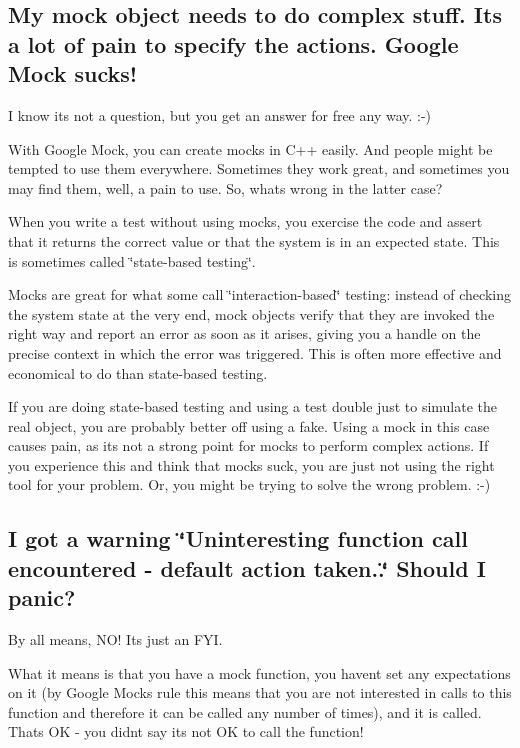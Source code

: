 \subsection*{My mock object needs to do complex stuff. It\textquotesingle{}s a lot of pain to specify the actions. Google Mock sucks!}

I know it\textquotesingle{}s not a question, but you get an answer for free any way. \+:-\/)

With Google Mock, you can create mocks in C++ easily. And people might be tempted to use them everywhere. Sometimes they work great, and sometimes you may find them, well, a pain to use. So, what\textquotesingle{}s wrong in the latter case?

When you write a test without using mocks, you exercise the code and assert that it returns the correct value or that the system is in an expected state. This is sometimes called \char`\"{}state-\/based testing\char`\"{}.

Mocks are great for what some call \char`\"{}interaction-\/based\char`\"{} testing\+: instead of checking the system state at the very end, mock objects verify that they are invoked the right way and report an error as soon as it arises, giving you a handle on the precise context in which the error was triggered. This is often more effective and economical to do than state-\/based testing.

If you are doing state-\/based testing and using a test double just to simulate the real object, you are probably better off using a fake. Using a mock in this case causes pain, as it\textquotesingle{}s not a strong point for mocks to perform complex actions. If you experience this and think that mocks suck, you are just not using the right tool for your problem. Or, you might be trying to solve the wrong problem. \+:-\/)

\subsection*{I got a warning \char`\"{}\+Uninteresting function call encountered -\/ default action taken..\char`\"{} Should I panic?}

By all means, N\+O! It\textquotesingle{}s just an F\+YI.

What it means is that you have a mock function, you haven\textquotesingle{}t set any expectations on it (by Google Mock\textquotesingle{}s rule this means that you are not interested in calls to this function and therefore it can be called any number of times), and it is called. That\textquotesingle{}s OK -\/ you didn\textquotesingle{}t say it\textquotesingle{}s not OK to call the function!

